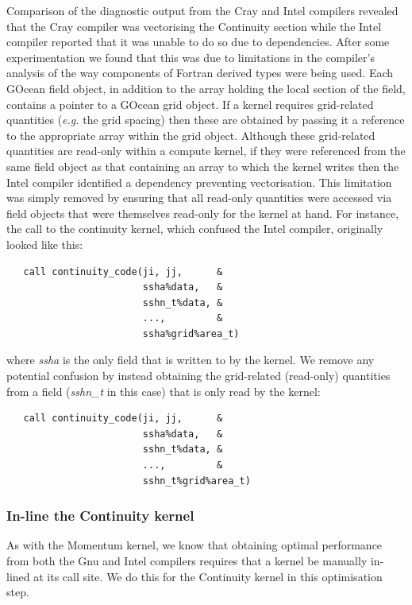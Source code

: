 \documentclass[gmdd, manuscript]{copernicus}
\begin{document}
Comparison of the diagnostic output from the Cray and Intel
compilers revealed that the Cray compiler was vectorising the
Continuity section while the Intel compiler reported that it was
unable to do so due to dependencies. After some experimentation we
found that this was due to limitations in the compiler's analysis of
the way components of Fortran derived types were being used. Each
GOcean field object, in addition to the array holding the local
section of the field, contains a pointer to a GOcean grid object. If a
kernel requires grid-related quantities (\textit{e.g.} the grid spacing)
then these are obtained by passing it a reference to the appropriate
array within the grid object. Although these grid-related quantities
are read-only within a compute kernel, if they were referenced from the
same field object as that containing an array to which the kernel writes
then the Intel compiler identified a dependency preventing
vectorisation.  This limitation was simply removed by ensuring that
all read-only quantities were accessed via field objects that were
themselves read-only for the kernel at hand.  For instance, the call
to the continuity kernel, which confused the Intel compiler, originally
looked like this:
\begin{verbatim}
   call continuity_code(ji, jj,      &
                        ssha%data,   &
                        sshn_t%data, &
                        ...,         &
                        ssha%grid%area_t)
\end{verbatim}
where \textit{ssha} is the only field that is written to by the kernel.
We remove any potential confusion by instead obtaining the
grid-related (read-only) quantities from a field (\textit{sshn\_t} in
this case) that is only read by the kernel:
\begin{verbatim}
   call continuity_code(ji, jj,      &
                        ssha%data,   &
                        sshn_t%data, &
                        ...,         &
                        sshn_t%grid%area_t)
\end{verbatim}

\subsubsection{In-line the Continuity kernel}
\label{sec_cont_inline}

As with the Momentum kernel, we know that obtaining optimal
performance from both the Gnu and Intel compilers requires that a
kernel be manually in-lined at its call site. We do this for the
Continuity kernel in this optimisation step.
\end{document}
